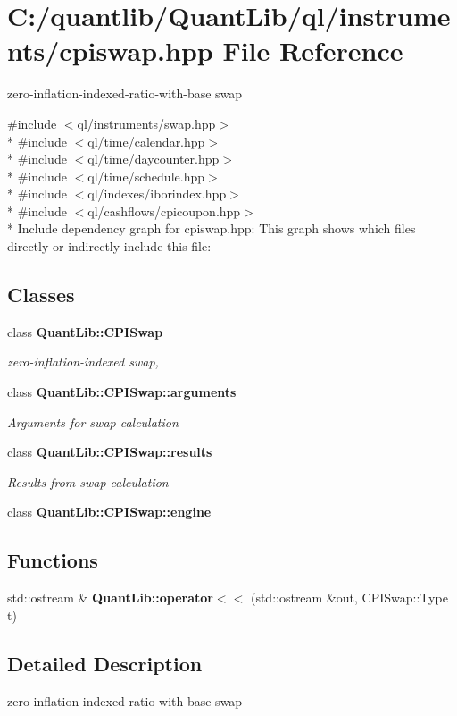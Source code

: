 \section{C\+:/quantlib/\+Quant\+Lib/ql/instruments/cpiswap.hpp File Reference}
\label{cpiswap_8hpp}


zero-\/inflation-\/indexed-\/ratio-\/with-\/base swap  


{\ttfamily \#include $<$ql/instruments/swap.\+hpp$>$}\\*
{\ttfamily \#include $<$ql/time/calendar.\+hpp$>$}\\*
{\ttfamily \#include $<$ql/time/daycounter.\+hpp$>$}\\*
{\ttfamily \#include $<$ql/time/schedule.\+hpp$>$}\\*
{\ttfamily \#include $<$ql/indexes/iborindex.\+hpp$>$}\\*
{\ttfamily \#include $<$ql/cashflows/cpicoupon.\+hpp$>$}\\*
Include dependency graph for cpiswap.\+hpp\+:
This graph shows which files directly or indirectly include this file\+:
\subsection*{Classes}
\begin{DoxyCompactItemize}
\item 
class {\bf Quant\+Lib\+::\+C\+P\+I\+Swap}
\begin{DoxyCompactList}\small\item\em zero-\/inflation-\/indexed swap, \end{DoxyCompactList}\item 
class {\bf Quant\+Lib\+::\+C\+P\+I\+Swap\+::arguments}
\begin{DoxyCompactList}\small\item\em Arguments for swap calculation \end{DoxyCompactList}\item 
class {\bf Quant\+Lib\+::\+C\+P\+I\+Swap\+::results}
\begin{DoxyCompactList}\small\item\em Results from swap calculation \end{DoxyCompactList}\item 
class {\bf Quant\+Lib\+::\+C\+P\+I\+Swap\+::engine}
\end{DoxyCompactItemize}
\subsection*{Functions}
\begin{DoxyCompactItemize}
\item 
std\+::ostream \& {\bfseries Quant\+Lib\+::operator$<$$<$} (std\+::ostream \&out, C\+P\+I\+Swap\+::\+Type t)\label{cpiswap_8cpp_ad8849f1e16d5caf8b223a560030e8eab}

\end{DoxyCompactItemize}


\subsection{Detailed Description}
zero-\/inflation-\/indexed-\/ratio-\/with-\/base swap 

